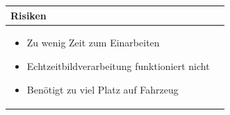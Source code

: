 \begin{table}[h]
\begin{tabular}{p{}p{}}


 \textbf{Risiken} & \\ \hline
	 
\begin{itemize}
\item Zu wenig Zeit zum Einarbeiten
\item Echtzeitbildverarbeitung funktioniert nicht
\item Benötigt zu viel Platz auf Fahrzeug
\end{itemize}

 
\end{tabular}
\end{table}

\pagebreak